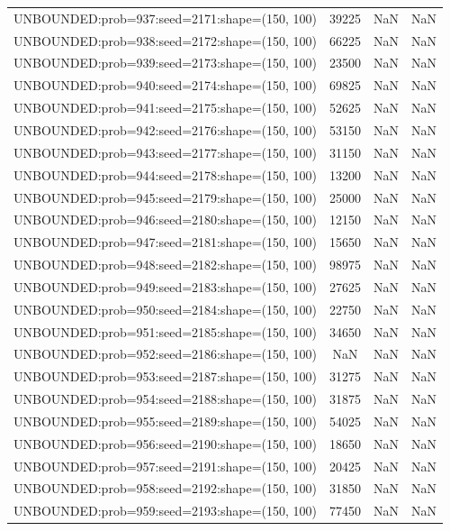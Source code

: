 \begin{longtable}{lccc}
UNBOUNDED:prob=937:seed=2171:shape=(150, 100) & 39225 &   NaN &    NaN \\
UNBOUNDED:prob=938:seed=2172:shape=(150, 100) & 66225 &   NaN &    NaN \\
UNBOUNDED:prob=939:seed=2173:shape=(150, 100) & 23500 &   NaN &    NaN \\
UNBOUNDED:prob=940:seed=2174:shape=(150, 100) & 69825 &   NaN &    NaN \\
UNBOUNDED:prob=941:seed=2175:shape=(150, 100) & 52625 &   NaN &    NaN \\
UNBOUNDED:prob=942:seed=2176:shape=(150, 100) & 53150 &   NaN &    NaN \\
UNBOUNDED:prob=943:seed=2177:shape=(150, 100) & 31150 &   NaN &    NaN \\
UNBOUNDED:prob=944:seed=2178:shape=(150, 100) & 13200 &   NaN &    NaN \\
UNBOUNDED:prob=945:seed=2179:shape=(150, 100) & 25000 &   NaN &    NaN \\
UNBOUNDED:prob=946:seed=2180:shape=(150, 100) & 12150 &   NaN &    NaN \\
UNBOUNDED:prob=947:seed=2181:shape=(150, 100) & 15650 &   NaN &    NaN \\
UNBOUNDED:prob=948:seed=2182:shape=(150, 100) & 98975 &   NaN &    NaN \\
UNBOUNDED:prob=949:seed=2183:shape=(150, 100) & 27625 &   NaN &    NaN \\
UNBOUNDED:prob=950:seed=2184:shape=(150, 100) & 22750 &   NaN &    NaN \\
UNBOUNDED:prob=951:seed=2185:shape=(150, 100) & 34650 &   NaN &    NaN \\
UNBOUNDED:prob=952:seed=2186:shape=(150, 100) &   NaN &   NaN &    NaN \\
UNBOUNDED:prob=953:seed=2187:shape=(150, 100) & 31275 &   NaN &    NaN \\
UNBOUNDED:prob=954:seed=2188:shape=(150, 100) & 31875 &   NaN &    NaN \\
UNBOUNDED:prob=955:seed=2189:shape=(150, 100) & 54025 &   NaN &    NaN \\
UNBOUNDED:prob=956:seed=2190:shape=(150, 100) & 18650 &   NaN &    NaN \\
UNBOUNDED:prob=957:seed=2191:shape=(150, 100) & 20425 &   NaN &    NaN \\
UNBOUNDED:prob=958:seed=2192:shape=(150, 100) & 31850 &   NaN &    NaN \\
UNBOUNDED:prob=959:seed=2193:shape=(150, 100) & 77450 &   NaN &    NaN \\

\end{longtable}
